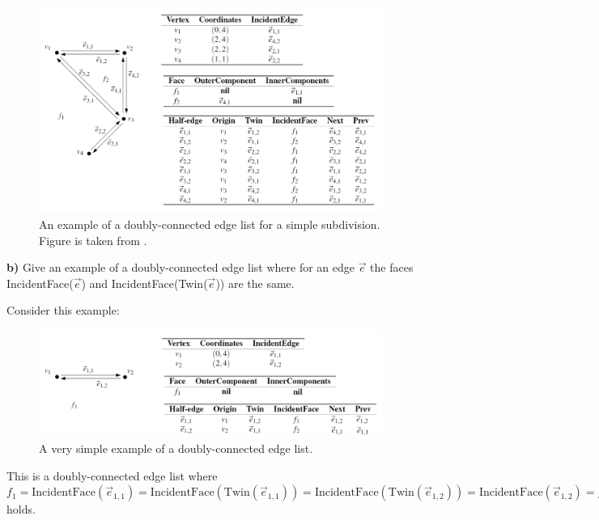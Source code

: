 \documentclass[english, fontsize=12pt, paper=a4, twoside=false, draft=true, pagesize=auto, version=last, DIV=16]{scrartcl}
\theoremstyle{break}
\begin{document}
\vspace*{10mm}
\newpage
\begin{figure}[t]
\centering
\includegraphics[width=\textwidth]{images/task_1_example.png}
\caption{An example of a doubly-connected edge list for a simple subdivision. Figure is taken from \cite{berg2008computational}.}
\label{fig:task_1_example}
\end{figure}

\textbf{b)} Give an example of a doubly-connected edge list where for an edge $\vec{e}$ the faces IncidentFace($\vec{e}$) and IncidentFace(Twin($\vec{e}$)) are the same. \par
\medskip
Consider this example: \\
\begin{figure}[h]
\centering
\includegraphics[width=\textwidth]{images/task_1_b.png}
\caption{A very simple example of a doubly-connected edge list.}
\label{fig:task_1_b}
\end{figure}

This is a doubly-connected edge list where $f_1 = \text{IncidentFace}(\vec{e}_{1,1}) = \text{IncidentFace}(\text{Twin}(\vec{e}_{1,1})) = \text{IncidentFace}(\text{Twin}(\vec{e}_{1,2})) = \text{IncidentFace}(\vec{e}_{1,2}) = f_1 $ holds.

\vspace*{10mm}
\newpage
\end{document}
